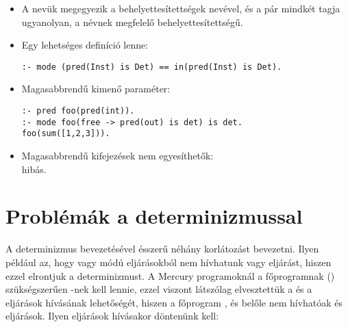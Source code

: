 \begin{itemize}
\item A nevük megegyezik a behelyettesítettségek nevével, és a pár mindkét
tagja ugyanolyan, a névnek megfelelő behelyettesítettségű.
\item Egy lehetséges definíció lenne:
\begin{verbatim}
:- mode (pred(Inst) is Det) == in(pred(Inst) is Det).
\end{verbatim}
\end{itemize}

\begin{itemize}
\item Magasabbrendű kimenő paraméter:
\begin{verbatim}
:- pred foo(pred(int)).
:- mode foo(free -> pred(out) is det) is det.
foo(sum([1,2,3])).
\end{verbatim}
\item Magasabbrendű kifejezések nem egyesíthetők:\\
 hibás.
\end{itemize}

\section{Problémák a determinizmussal}

A determinizmus bevezetésével ésszerű néhány korlátozást bevezetni. Ilyen például az,
hogy  vagy  módú eljárásokból nem hívhatunk  vagy
 eljárást, hiszen ezzel elrontjuk a determinizmust. A Mercury programoknál a
főprogramnak () szükségszerűen -nek kell lennie, ezzel viszont
látszólag elvesztettük a  és a  eljárások hívásának lehetőségét,
hiszen a főprogram , és belőle nem hívhatóak  és  eljárások.
Ilyen eljárások hívásakor döntenünk kell:

